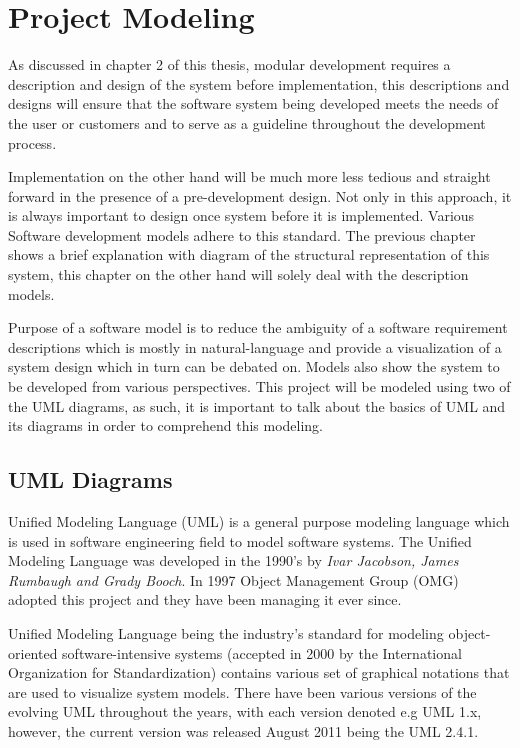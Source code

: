 \chapter{Project Modeling}
As discussed in chapter 2 of this thesis, modular development requires a description and design of the system before implementation, this descriptions and designs will ensure that the software system being developed meets the needs of the user or customers and to serve as a guideline throughout the development process. 

Implementation on the other hand will be much more less tedious and straight forward in the presence of a pre-development design. Not only in this approach, it is always important to design once system before it is implemented. Various Software development models adhere to this standard. The previous chapter shows a brief explanation with diagram of the structural representation of this system, this chapter on the other hand will solely deal with the description models.

Purpose of a software model is to reduce the ambiguity of a software requirement descriptions which is mostly in natural-language and provide a visualization of a system design which in turn can be debated on. Models also show the system to be developed from various perspectives. This project will be modeled using two of the UML diagrams, as such, it is important to talk about the basics of UML and its diagrams in order to comprehend this modeling.

\section{UML Diagrams}
Unified Modeling Language (UML) is a general purpose modeling language which is used in software engineering field to model software systems. The Unified Modeling Language was developed in the 1990's by {\it Ivar Jacobson, James Rumbaugh and Grady Booch}. In 1997 Object Management Group (OMG) adopted this project and they have been managing it ever since.

Unified Modeling Language being the industry's standard for modeling object-oriented software-intensive systems (accepted in 2000 by the International Organization for Standardization) contains various set of graphical notations that are used to visualize system models. There have been various versions of the evolving UML throughout the years, with each version denoted e.g UML 1.x, however, the current version was released August 2011 being the UML 2.4.1. 

